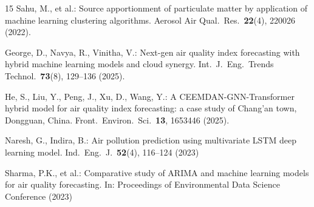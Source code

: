 \documentclass[runningheads]{llncs}
\begin{document}
\begin{thebibliography}{15}
Sahu, M., et al.: Source apportionment of particulate matter by
application of machine learning clustering algorithms.
Aerosol Air Qual.\ Res.\ \textbf{22}(4), 220026 (2022).

George, D., Navya, R., Vinitha, V.: Next-gen air quality index
forecasting with hybrid machine learning models and cloud synergy.
Int.\ J.\ Eng.\ Trends Technol.\ \textbf{73}(8), 129--136 (2025).

He, S., Liu, Y., Peng, J., Xu, D., Wang, Y.: A CEEMDAN-GNN-Transformer
hybrid model for air quality index forecasting: a case study of
Chang'an town, Dongguan, China. Front.\ Environ.\ Sci.\ \textbf{13},
1653446 (2025). 

Naresh, G., Indira, B.: Air pollution prediction using multivariate
LSTM deep learning model. Ind.\ Eng.\ J.\ \textbf{52}(4),
116--124 (2023)

Sharma, P.K., et al.: Comparative study of ARIMA and machine learning
models for air quality forecasting. In: Proceedings of Environmental
Data Science Conference (2023)

\end{thebibliography}
\end{document}
